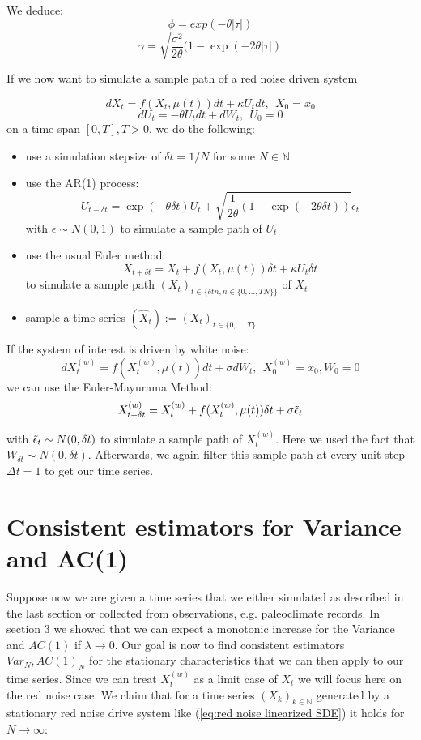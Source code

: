 \documentclass[%
thesis=student,%
coverpage=false,%
titlepage=false,%
headmarks=true, %
english,%
font=libertine, %
math=newpxtx, %
BCOR=5mm,%
coverBCOR=11mm%
]{tumbook}
\begin{document}
We deduce: 
    \[
        \phi = exp(-\theta \lvert \tau \rvert)
    \]
    \[
        \gamma = \sqrt{\frac{\sigma^{2}}{2\theta}(1-\exp(-2\theta \lvert \tau \rvert)}
    \]

If we now want to simulate a sample path of a red noise driven system

\[ 
     dX_{t} = f(X_{t},\mu(t))dt + \kappa U_{t}dt,\ \  X_{0} = x_{0}
\]
\[
     dU_{t} = -\theta U_{t}dt + dW_{t},\ \ U_{0} = 0
\]
on a time span $[0,T], T > 0$, we do the following: 
\begin{itemize}
    \item use a simulation stepsize of $\delta t = 1/N$ for some $N \in \mathbb{N}$
    \item use the AR(1) process:
    \[
    U_{t+\delta t} = \exp(-\theta \delta t)U_{t} + \sqrt{\frac{1}{2\theta}(1-\exp(-2\theta \delta t))}\epsilon_{t}
    \]
    with $\epsilon \sim N(0,1)$ to simulate a sample path of $U_{t}$
    \item use the usual Euler method:
    \[
        X_{t+\delta t} = X_{t} + f(X_{t},\mu(t))\delta t + \kappa U_{t}\delta t
    \]
    to simulate a sample path $(X_{t})_{t\in\{\delta t n, n \in \{0,...,TN\}\}}$ of $X_{t}$
    \item sample a time series $(\widehat{X}_t) := (X_t)_{t\in\{0,...,T\}}$
\end{itemize}


If the system of interest is driven by white noise: 
\[
    dX_{t}^{(w)} = f(X_{t}^{(w)},\mu(t))dt + \sigma dW_{t}, \ \ X_{0}^{(w)} = x_{0}, W_{0} = 0
\]
we can use the Euler-Mayurama Method:
\[
X_{t+\delta t}^{(w)} = X_{t}^{(w)} + f(X_{t}^{(w)},\mu(t))\delta t + \sigma\Tilde{\epsilon}_t
\]

with $\Tilde{\epsilon}_t \sim N(0,\delta t)$ to simulate a sample path of $X_{t}^{(w)}$. Here we used the fact that $W_{\delta t} \sim N(0,\delta t)$. Afterwards, we again filter this sample-path at every unit step $\Delta t = 1$ to get our time series.



\chapter{Consistent estimators for Variance and AC(1)}

Suppose now we are given a time series that we either simulated as described in the last section or collected from observations, e.g. paleoclimate records. In section 3 we showed that we can expect a monotonic increase for the Variance and $AC(1)$ if $\lambda \rightarrow 0$. Our goal is now to find consistent estimators $Var_N, AC(1)_N$ for the stationary characteristics that we can then apply to our time series. Since we can treat $X_{t}^{(w)}$ as a limit case of $X_{t}$ we will focus here on the red noise case. We claim that for a time series $(X_{k})_{k\in\mathbb{N}}$ generated by a stationary red noise drive system like (\ref{eq:red noise linearized SDE}) it holds for $N \rightarrow \infty$:
\end{document}
